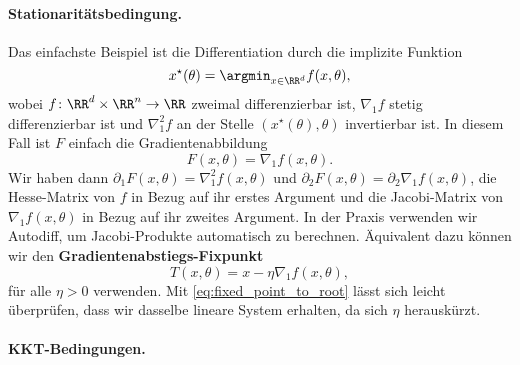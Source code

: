 \paragraph{Stationaritätsbedingung.}

Das einfachste Beispiel ist die Differentiation durch die implizite Funktion
\begin{equation}
x^\star(\theta) = \argmin_{x \in \RR^d} f(x, \theta),
\end{equation}
wobei $f \colon \RR^d \times \RR^n \to \RR$ zweimal differenzierbar ist, $\nabla_1 f$ stetig differenzierbar ist und $\nabla^2_1 f$ an der Stelle $(x^\star(\theta),\theta)$ invertierbar ist.
In diesem Fall ist $F$ einfach die Gradientenabbildung
\begin{equation}
F(x, \theta) = \nabla_1 f(x, \theta).
\label{eq:stationary_cond}
\end{equation}
Wir haben dann
$\partial_1 F(x, \theta) = \nabla^2_1 f(x, \theta)$
und
$\partial_2 F(x, \theta) = \partial_2 \nabla_1 f(x, \theta)$,
die Hesse-Matrix von $f$ in Bezug auf ihr erstes Argument und die Jacobi-Matrix von $\nabla_1 f(x, \theta)$ in Bezug auf ihr zweites Argument. In der Praxis verwenden wir Autodiff, um Jacobi-Produkte automatisch zu berechnen.
Äquivalent dazu können wir den \textbf{Gradientenabstiegs-Fixpunkt}
\begin{equation}
T(x, \theta) = x - \eta \nabla_1 f(x, \theta),
\label{eq:gradient_descent_fp}
\end{equation}
für alle $\eta > 0$ verwenden. Mit \eqref{eq:fixed_point_to_root} lässt sich leicht überprüfen, dass wir dasselbe lineare System erhalten, da sich $\eta$ herauskürzt.

\paragraph{KKT-Bedingungen.}


